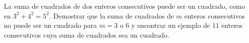 La suma de cuadrados de dos enteros consecutivos puede ser un cuadrado, como en $3^2+4^2 =5^2$. Demostrar que la suma de cuadrados de $m$ enteros consecutivos no puede ser un cuadrado para $m = 3$ o $6$ y encontrar un ejemplo de $11$ enteros consecutivos cuya suma de cuadrados sea un cuadrado. 

